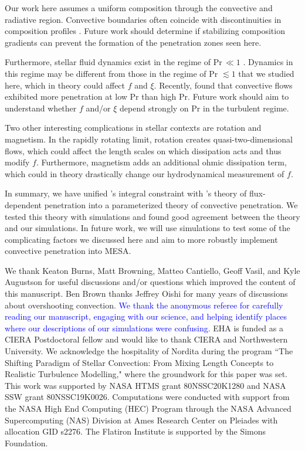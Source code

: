 \documentclass[twocolumn, linenumbers]{aastex631}
\newcommand\Pran{\ensuremath{\mathrm{Pr}}}
\newcommand{\edittwo}[1]{\textcolor{blue}{#1}}
\begin{document}
Our work here assumes a uniform composition through the convective and radiative region.
Convective boundaries often coincide with discontinuities in composition profiles \citep{salaris_cassisi_2017}.
Future work should determine if stabilizing composition gradients can prevent the formation of the penetration zones seen here.

Furthermore, stellar fluid dynamics exist in the regime of Pr$\,\ll1$ \citep{garaud2021}.
Dynamics in this regime may be different from those in the regime of Pr $\lesssim 1$ that we studied here, which in theory could affect $f$ and $\xi$.
Recently, \citet{kapyla2021} found that convective flows exhibited more penetration at low Pr than high Pr.
Future work should aim to understand whether $f$ and/or $\xi$ depend strongly on $\Pran$ in the turbulent regime.

Two other interesting complications in stellar contexts are rotation and magnetism.
In the rapidly rotating limit, rotation creates quasi-two-dimensional flows, which could affect the length scales on which dissipation acts and thus modify $f$.
Furthermore, magnetism adds an additional ohmic dissipation term, which could in theory drastically change our hydrodynamical measurement of $f$.

In summary, we have unified \citet{roxburgh1989}'s integral constraint with \citet{zahn1991}'s theory of flux-dependent penetration into a parameterized theory of convective penetration.
We tested this theory with simulations and found good agreement between the theory and our simulations.
In future work, we will use simulations to test some of the complicating factors we discussed here and aim to more robustly implement convective penetration into MESA.



\begin{acknowledgments}
We thank Keaton Burns, Matt Browning, Matteo Cantiello, Geoff Vasil, and Kyle Augustson for useful discussions and/or questions which improved the content of this manuscript.
Ben Brown thanks Jeffrey Oishi for many years of discussions about overshooting convection.
    \edittwo{
        We thank the anonymous referee for carefully reading our manuscript, engaging with our science, and helping identify places where our descriptions of our simulations were confusing.
}EHA is funded as a CIERA Postdoctoral fellow and would like to thank CIERA and Northwestern University. 
We acknowledge the hospitality of Nordita during the program ``The Shifting Paradigm of Stellar Convection: From Mixing Length Concepts to Realistic Turbulence Modelling," where the groundwork for this paper was set.
This work was supported by NASA HTMS grant 80NSSC20K1280 and NASA SSW grant 80NSSC19K0026.
Computations were conducted with support from the NASA High End Computing (HEC) Program through the NASA Advanced Supercomputing (NAS) Division at Ames Research Center on Pleiades with allocation GID s2276.
The Flatiron Institute is supported by the Simons Foundation.
\end{acknowledgments}
\end{document}
